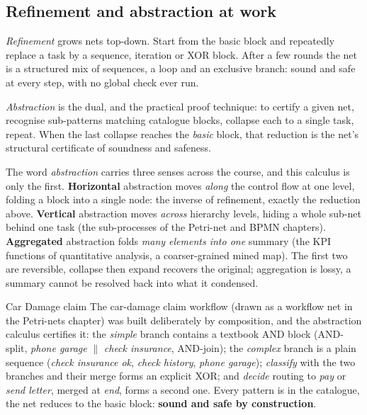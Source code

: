 \subsection{Refinement and abstraction at work}

\emph{Refinement} grows nets top-down. Start from the basic block and repeatedly replace a task by a sequence, iteration or XOR block. After a few rounds the net is a structured mix of sequences, a loop and an exclusive branch: sound and safe at every step, with no global check ever run.

\emph{Abstraction} is the dual, and the practical proof technique: to certify a given net, recognise sub-patterns matching catalogue blocks, collapse each to a single task, repeat. When the last collapse reaches the \emph{basic} block, that reduction is the net's structural certificate of soundness and safeness.
\par\smallskip
The word \emph{abstraction} carries three senses across the course, and this calculus is only the first. \textbf{Horizontal} abstraction moves \emph{along} the control flow at one level, folding a block into a single node: the inverse of refinement, exactly the reduction above. \textbf{Vertical} abstraction moves \emph{across} hierarchy levels, hiding a whole sub-net behind one task (the sub-processes of the Petri-net and BPMN chapters). \textbf{Aggregated} abstraction folds \emph{many elements into one} summary (the KPI functions of quantitative analysis, a coarser-grained mined map). The first two are reversible, collapse then expand recovers the original; aggregation is lossy, a summary cannot be resolved back into what it condensed.

\begin{examplebox}{Car Damage claim}
The car-damage claim workflow (drawn as a workflow net in the Petri-nets chapter) was built deliberately by composition, and the abstraction calculus certifies it: the \emph{simple} branch contains a textbook AND block (AND-split, \emph{phone garage} $\parallel$ \emph{check insurance}, AND-join); the \emph{complex} branch is a plain sequence (\emph{check insurance ok}, \emph{check history}, \emph{phone garage}); \emph{classify} with the two branches and their merge forms an explicit XOR; and \emph{decide} routing to \emph{pay} or \emph{send letter}, merged at \emph{end}, forms a second one. Every pattern is in the catalogue, the net reduces to the basic block: \textbf{sound and safe by construction}.
\end{examplebox}

